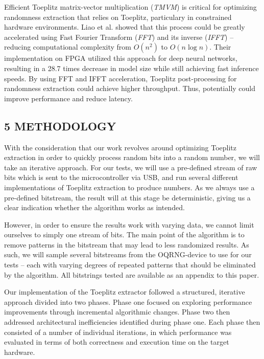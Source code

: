 Efficient Toeplitz matrix-vector multiplication (\emph{TMVM}) is critical for optimizing randomness extraction that relies on Toeplitz, particulary in constrained hardware environments. Liao et al. \cite{liao} showed that this process could be greatly accelerated using Fast Fourier Transform (\emph{FFT}) and its inverse (\emph{IFFT}) -- reducing computational complexity from \(O(n^2)\) to \(O(n \log n)\). Their implementation on FPGA utilized this approach for deep neural networks, resulting in a 28.7 times decrease in model size while still achieving fast inference speeds. By using FFT and IFFT acceleration, Toeplitz post-processing for randomness extraction could achieve higher throughput. Thus, potentially could improve performance and reduce latency.

\hypertarget{methodology}{%
\subsection{5 METHODOLOGY}\label{methodology}}

With the consideration that our work revolves around optimizing Toeplitz extraction in order to quickly process random bits into a random number, we will take an iterative approach. For our tests, we will use a pre-defined stream of raw bits which is sent to the microcontroller via USB, and run several different implementations of Toeplitz extraction to produce numbers. As we always use a pre-defined bitstream, the result will at this stage be deterministic, giving us a clear indication whether the algorithm works as intended.

However, in order to ensure the results work with varying data, we cannot limit ourselves to simply one stream of bits. The main point of the algorithm is to remove patterns in the bitstream that may lead to less randomized results. As such, we will sample several bitstreams from the OQRNG-device to use for our tests -- each with varying degrees of repeated patterns that should be eliminated by the algorithm. All bitstrings tested are available as an appendix to this paper.

Our implementation of the Toeplitz extractor followed a structured, iterative approach divided into two phases. Phase one focused on exploring performance improvements through incremental algorithmic changes. Phase two then addressed architectural inefficiencies identified during phase one. Each phase then consisted of a number of individual iterations, in which performance was evaluated in terms of both correctness and execution time on the target hardware.

